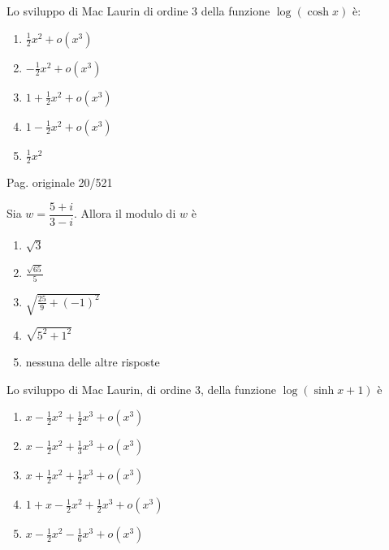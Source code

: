 \begin{quiz}
Lo sviluppo di Mac Laurin di ordine 3 della funzione $\log(\cosh x)$ \`e:
\begin{enumerate}[label=\alph*),leftmargin=1.3cm,itemsep=3pt,topsep=5pt]
\item $\frac12x^2+o(x^3)$
\item $-\frac12x^2+o(x^3)$
\item $1+\frac12x^2+o(x^3)$
\item $1-\frac12x^2+o(x^3)$
\item $\frac12x^2$
\end{enumerate}
\end{quiz}

\par\noindent\hfill{\color{cyan!65!black}\scriptsize Pag. originale 20/521}\par\smallskip

\begin{quiz}
Sia $w=\dfrac{5+i}{3-i}$. Allora il modulo di $w$ \`e
\begin{enumerate}[label=\alph*),leftmargin=1.3cm,itemsep=3pt,topsep=5pt]
\item $\sqrt3$
\item $\frac{\sqrt{65}}5$
\item $\sqrt{\frac{25}9+(-1)^2}$
\item $\sqrt{5^2+1^2}$
\item nessuna delle altre risposte
\end{enumerate}
\end{quiz}

\begin{quiz}
Lo sviluppo di Mac Laurin, di ordine 3, della funzione $\log(\sinh x+1)$ \`e
\begin{enumerate}[label=\alph*),leftmargin=1.3cm,itemsep=3pt,topsep=5pt]
\item $x-\frac12x^2+\frac12x^3+o(x^3)$
\item $x-\frac12x^2+\frac13x^3+o(x^3)$
\item $x+\frac12x^2+\frac12x^3+o(x^3)$
\item $1+x-\frac12x^2+\frac12x^3+o(x^3)$
\item $x-\frac12x^2-\frac16x^3+o(x^3)$
\end{enumerate}
\end{quiz}

